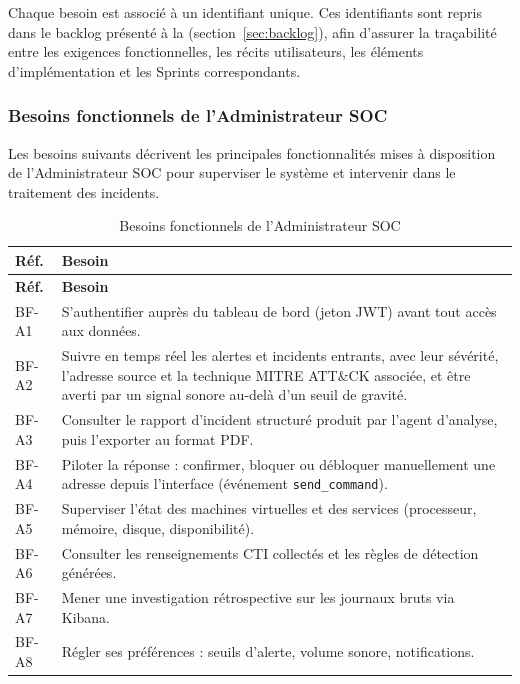 Chaque besoin est associé à un identifiant unique. Ces identifiants sont repris dans le backlog présenté à la (section~\ref{sec:backlog}), afin d'assurer la traçabilité entre les exigences fonctionnelles, les récits utilisateurs, les éléments d'implémentation et les Sprints correspondants.  

\subsubsection{Besoins fonctionnels de l'Administrateur SOC}

Les besoins suivants décrivent les principales fonctionnalités mises à disposition de l'Administrateur SOC pour superviser le système et intervenir dans le traitement des incidents.


\renewcommand{\arraystretch}{1.5}
\small
\begin{xltabular}{\textwidth}{|l|>{\raggedright\arraybackslash}X|}

\caption{Besoins fonctionnels de l'Administrateur SOC}
\label{tab:bf-admin} \\

\hline
{}
\textbf{Réf.} & \textbf{Besoin} \\ \hline
\endfirsthead

\hline
{}
\textbf{Réf.} & \textbf{Besoin} \\ \hline
\endhead

BF-A1 & S'authentifier auprès du tableau de bord (jeton JWT) avant tout accès aux données. \\ \hline
BF-A2 & Suivre en temps réel les alertes et incidents entrants, avec leur sévérité, l'adresse source et la technique MITRE ATT\&CK associée, et être averti par un signal sonore au-delà d'un seuil de gravité. \\ \hline
BF-A3 & Consulter le rapport d'incident structuré produit par l'agent d'analyse, puis l'exporter au format PDF. \\ \hline
BF-A4 & Piloter la réponse : confirmer, bloquer ou débloquer manuellement une adresse depuis l'interface (événement \texttt{send\_command}). \\ \hline
BF-A5 & Superviser l'état des machines virtuelles et des services (processeur, mémoire, disque, disponibilité). \\ \hline
BF-A6 & Consulter les renseignements CTI collectés et les règles de détection générées. \\ \hline
BF-A7 & Mener une investigation rétrospective sur les journaux bruts via Kibana. \\ \hline
BF-A8 & Régler ses préférences : seuils d'alerte, volume sonore, notifications. \\ \hline

\end{xltabular}


